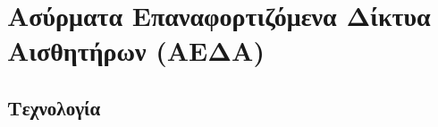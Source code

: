 

\chapter{Ασύρματα Επαναφορτιζόμενα Δίκτυα Αισθητήρων (ΑΕΔΑ)}
\section{Τεχνολογία}
\label{ch:wrsns}